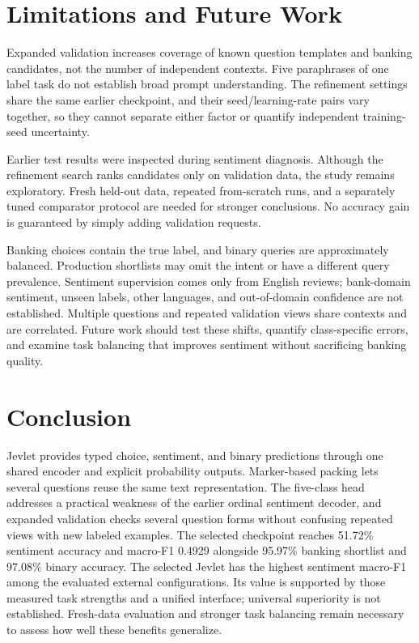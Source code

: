 \documentclass[conference]{IEEEtran}
\begin{document}
\section{Limitations and Future Work}
Expanded validation increases coverage of known question templates and banking candidates, not the number of independent contexts. Five paraphrases of one label task do not establish broad prompt understanding. The refinement settings share the same earlier checkpoint, and their seed/learning-rate pairs vary together, so they cannot separate either factor or quantify independent training-seed uncertainty.

Earlier test results were inspected during sentiment diagnosis. Although the refinement search ranks candidates only on validation data, the study remains exploratory. Fresh held-out data, repeated from-scratch runs, and a separately tuned comparator protocol are needed for stronger conclusions. No accuracy gain is guaranteed by simply adding validation requests.

Banking choices contain the true label, and binary queries are approximately balanced. Production shortlists may omit the intent or have a different query prevalence. Sentiment supervision comes only from English reviews; bank-domain sentiment, unseen labels, other languages, and out-of-domain confidence are not established. Multiple questions and repeated validation views share contexts and are correlated. Future work should test these shifts, quantify class-specific errors, and examine task balancing that improves sentiment without sacrificing banking quality.

\section{Conclusion}
Jevlet provides typed choice, sentiment, and binary predictions through one shared encoder and explicit probability outputs. Marker-based packing lets several questions reuse the same text representation. The five-class head addresses a practical weakness of the earlier ordinal sentiment decoder, and expanded validation checks several question forms without confusing repeated views with new labeled examples. The selected checkpoint reaches 51.72\% sentiment accuracy and macro-F1 0.4929 alongside 95.97\% banking shortlist and 97.08\% binary accuracy. The selected Jevlet has the highest sentiment macro-F1 among the evaluated external configurations. Its value is supported by those measured task strengths and a unified interface; universal superiority is not established. Fresh-data evaluation and stronger task balancing remain necessary to assess how well these benefits generalize.
\end{document}
